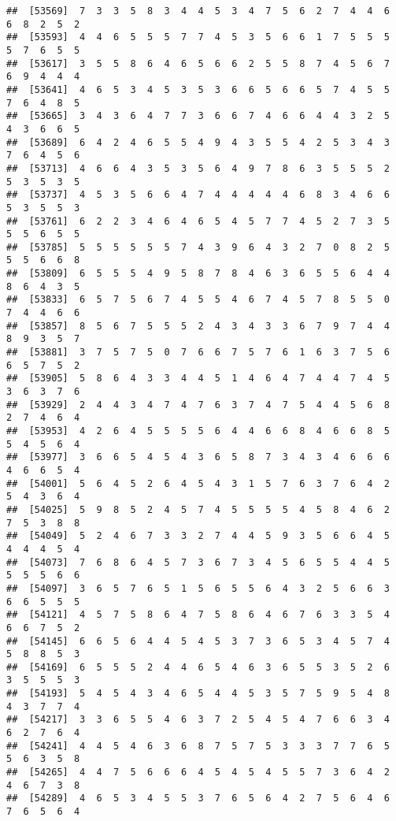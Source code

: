 \documentclass[
]{book}
\begin{document}
\begin{verbatim}
##  [53569]  7  3  3  5  8  3  4  4  5  3  4  7  5  6  2  7  4  4  6  6  8  2  5  2
##  [53593]  4  4  6  5  5  5  7  7  4  5  3  5  6  6  1  7  5  5  5  5  7  6  5  5
##  [53617]  3  5  5  8  6  4  6  5  6  6  2  5  5  8  7  4  5  6  7  6  9  4  4  4
##  [53641]  4  6  5  3  4  5  3  5  3  6  6  5  6  6  5  7  4  5  5  7  6  4  8  5
##  [53665]  3  4  3  6  4  7  7  3  6  6  7  4  6  6  4  4  3  2  5  4  3  6  6  5
##  [53689]  6  4  2  4  6  5  5  4  9  4  3  5  5  4  2  5  3  4  3  7  6  4  5  6
##  [53713]  4  6  6  4  3  5  3  5  6  4  9  7  8  6  3  5  5  5  2  5  3  5  3  5
##  [53737]  4  5  3  5  6  6  4  7  4  4  4  4  4  6  8  3  4  6  6  5  3  5  5  3
##  [53761]  6  2  2  3  4  6  4  6  5  4  5  7  7  4  5  2  7  3  5  5  5  6  5  5
##  [53785]  5  5  5  5  5  5  7  4  3  9  6  4  3  2  7  0  8  2  5  5  5  6  6  8
##  [53809]  6  5  5  5  4  9  5  8  7  8  4  6  3  6  5  5  6  4  4  8  6  4  3  5
##  [53833]  6  5  7  5  6  7  4  5  5  4  6  7  4  5  7  8  5  5  0  7  4  4  6  6
##  [53857]  8  5  6  7  5  5  5  2  4  3  4  3  3  6  7  9  7  4  4  8  9  3  5  7
##  [53881]  3  7  5  7  5  0  7  6  6  7  5  7  6  1  6  3  7  5  6  6  5  7  5  2
##  [53905]  5  8  6  4  3  3  4  4  5  1  4  6  4  7  4  4  7  4  5  3  6  3  7  6
##  [53929]  2  4  4  3  4  7  4  7  6  3  7  4  7  5  4  4  5  6  8  2  7  4  6  4
##  [53953]  4  2  6  4  5  5  5  5  6  4  4  6  6  8  4  6  6  8  5  5  4  5  6  4
##  [53977]  3  6  6  5  4  5  4  3  6  5  8  7  3  4  3  4  6  6  6  4  6  6  5  4
##  [54001]  5  6  4  5  2  6  4  5  4  3  1  5  7  6  3  7  6  4  2  5  4  3  6  4
##  [54025]  5  9  8  5  2  4  5  7  4  5  5  5  5  4  5  8  4  6  2  7  5  3  8  8
##  [54049]  5  2  4  6  7  3  3  2  7  4  4  5  9  3  5  6  6  4  5  4  4  4  5  4
##  [54073]  7  6  8  6  4  5  7  3  6  7  3  4  5  6  5  5  4  4  5  5  5  5  6  6
##  [54097]  3  6  5  7  6  5  1  5  6  5  5  6  4  3  2  5  6  6  3  6  6  5  5  5
##  [54121]  4  5  7  5  8  6  4  7  5  8  6  4  6  7  6  3  3  5  4  6  6  7  5  2
##  [54145]  6  6  5  6  4  4  5  4  5  3  7  3  6  5  3  4  5  7  4  5  8  8  5  3
##  [54169]  6  5  5  5  2  4  4  6  5  4  6  3  6  5  5  3  5  2  6  3  5  5  5  3
##  [54193]  5  4  5  4  3  4  6  5  4  4  5  3  5  7  5  9  5  4  8  4  3  7  7  4
##  [54217]  3  3  6  5  5  4  6  3  7  2  5  4  5  4  7  6  6  3  4  6  2  7  6  4
##  [54241]  4  4  5  4  6  3  6  8  7  5  7  5  3  3  3  7  7  6  5  5  6  3  5  8
##  [54265]  4  4  7  5  6  6  6  4  5  4  5  4  5  5  7  3  6  4  2  4  6  7  3  8
##  [54289]  4  6  5  3  4  5  5  3  7  6  5  6  4  2  7  5  6  4  6  7  6  5  6  4

\end{verbatim}
\end{document}

